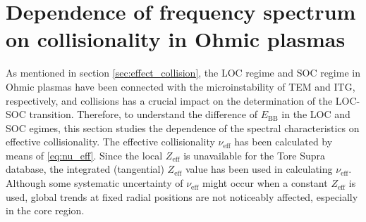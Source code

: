 \section{Dependence of frequency spectrum on collisionality in Ohmic plasmas} \label{sec:spec_OH}



As mentioned in section \ref{sec:effect_collision}, the LOC regime and SOC regime in Ohmic plasmas have been connected with the microinstability of TEM and ITG, respectively, and collisions has a crucial impact on the determination of the LOC-SOC transition. Therefore, to understand the difference of $E_\mathrm{BB}$ in the LOC and SOC egimes, this section studies the dependence of the spectral characteristics on effective collisionality. The effective collisionality $\nu_\mathrm{eff}$ has been calculated by means of \eqref{eq:nu_eff}. Since the local $Z_\mathrm{eff}$ is unavailable for the Tore Supra database, the integrated (tangential) $Z_\mathrm{eff}$ value has been used in calculating $\nu_\mathrm{eff}$. Although some systematic uncertainty of $\nu_\mathrm{eff}$ might occur when a constant $Z_\mathrm{eff}$ is used, global trends at fixed radial positions are not noticeably affected, especially in the core region.


